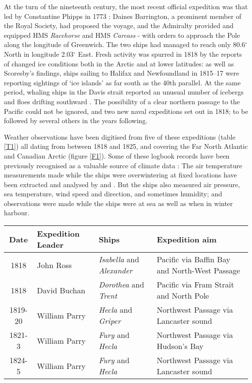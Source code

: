 \documentclass[CP]{copernicus}
\begin{document}
At the turn of the nineteenth century, the most recent official expedition was that led by Constantine Phipps in 1773 \citep{phipps_1775}: Daines Barrington, a prominent member of the Royal Society, had proposed the voyage, and the Admiralty provided and equipped HMS {\it Racehorse} and HMS {\it Carcass} - with orders to approach the Pole along the longitude of Greenwich. The two ships had managed to reach only 80.6$^\circ$ North in longitude 2.03$^\circ$ East. Fresh activity was spurred in 1818 by the reports of changed ice conditions both in the Arctic and at lower latitudes: as well as Scoresby's findings, ships sailing to Halifax and Newfoundland in 1815--17 were reporting sightings of `ice islands' as far south as the 40th parallel. At the same period, whaling ships in the Davis strait reported an unusual number of icebergs and floes drifting southward \citep{barringdon_1818}. The possibility of a clear northern passage to the Pacific could not be ignored, and two new naval expeditions set out in 1818; to be followed by several others in the years following.

Weather observations have been digitised from five of these expeditions (table \ref{T1}) all dating from between 1818 and 1825, and covering the Far North Atlantic and Canadian Arctic (figure \ref{F1}). Some of these logbook records have been previously recognised as a valuable source of climate data \citep{ward06instruments}: The air temperature measurements made while the ships were overwintering at fixed locations have been extracted and analysed by \citet{przybylak05Arctic} and \citet{przybylak09Arctic}. But the ships also measured air pressure, sea temperature, wind speed and direction, and sometimes humidity; and observations were made while the ships were at sea as well as when in winter harbour. 

\begin{table*}[!hbp]
\begin{center}
\begin{tabular}{|c|p{3cm}|p{3cm}|p{6cm}|}
\hline
{\bf Date} & {\bf Expedition Leader} & {\bf Ships} & {\bf Expedition aim}\\
\hline
1818 & John Ross & {\it Isabella} and {\it Alexander} & Pacific via Baffin Bay and North-West Passage \\
\hline
1818 & David Buchan & {\it Dorothea} and {\it Trent} & Pacific via Fram Strait and North Pole \\
\hline
1819-20 & William Parry & {\it Hecla} and {\it Griper} & Northwest Passage via Lancaster sound \\
\hline
1821-3 & William Parry & {\it Fury} and {\it Hecla} & Northwest Passage via Hudson's Bay \\
\hline
1824-5 & William Parry & {\it Fury} and {\it Hecla} & Northwest Passage via Lancaster sound \\
\hline
\end{tabular}
\vspace{0.5cm}
\caption{Expeditions from which observations were digitised}
\label{T1}
\end{center}\end{table*}
\end{document}
